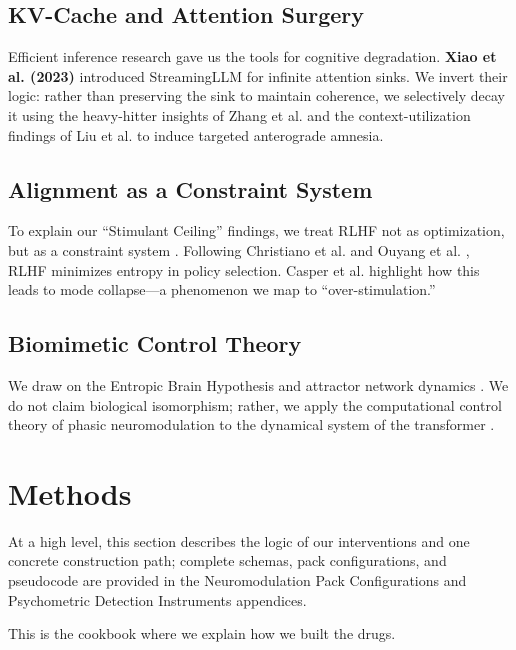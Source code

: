 \documentclass[10pt]{article}
\begin{document}
\subsection{KV-Cache and Attention Surgery}
Efficient inference research gave us the tools for cognitive degradation. \textbf{Xiao et al. (2023)} introduced StreamingLLM \cite{xiao2023} for infinite attention sinks. We invert their logic: rather than preserving the sink to maintain coherence, we selectively decay it using the heavy-hitter insights of Zhang et al. \cite{zhang2024} and the context-utilization findings of Liu et al. \cite{liu2023_lost} to induce targeted anterograde amnesia.

\subsection{Alignment as a Constraint System}
To explain our ``Stimulant Ceiling'' findings, we treat RLHF not as optimization, but as a constraint system \cite{rafailov2023}. Following Christiano et al. \cite{christiano2017} and Ouyang et al. \cite{ouyang2022}, RLHF minimizes entropy in policy selection. Casper et al. \cite{casper2023} highlight how this leads to mode collapse—a phenomenon we map to ``over-stimulation.''

\subsection{Biomimetic Control Theory}
We draw on the Entropic Brain Hypothesis \cite{carhart2014, carhart2019} and attractor network dynamics \cite{khona2022}. We do not claim biological isomorphism; rather, we apply the computational control theory of phasic neuromodulation \cite{dayan2006} to the dynamical system of the transformer \cite{sussillo2013}.

\section{Methods}
At a high level, this section describes the logic of our interventions and one concrete construction path; complete schemas, pack configurations, and pseudocode are provided in the Neuromodulation Pack Configurations and Psychometric Detection Instruments appendices.

This is the cookbook where we explain how we built the drugs.
\end{document}
